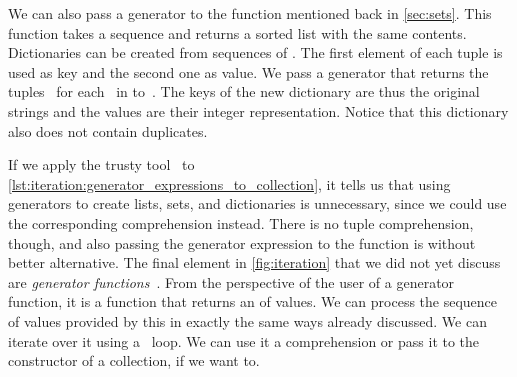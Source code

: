 %
We can also pass a generator to the  function mentioned back in \cref{sec:sets}.
This function takes a sequence and returns a sorted list with the same contents.
Dictionaries can be created from sequences of .
The first element of each tuple is used as key and the second one as value.
We pass a generator that returns the tuples~ for each~ in  to~.
The keys of the new dictionary are thus the original strings and the values are their integer representation.
Notice that this dictionary also does not contain duplicates.

If we apply the trusty tool \ruff\ to \cref{lst:iteration:generator_expressions_to_collection}, it tells us that using generators to create lists, sets, and dictionaries is unnecessary, since we could use the corresponding comprehension instead.
There is no tuple comprehension, though, and also passing the generator expression to the  function is without better alternative.%
%
%
%
%
\FloatBarrier%
\endhsection%
%
%
%
%
%
%
%
%
%
%
%
%
The final element in \cref{fig:iteration} that we did not yet discuss are \emph{generator functions}~\cite{PEP255}.
From the perspective of the user of a generator function, it is a function that returns an  of values.
We can process the sequence of values provided by this  in exactly the same ways already discussed.
We can iterate over it using a ~loop.
We can use it a comprehension or pass it to the constructor of a collection, if we want to.

